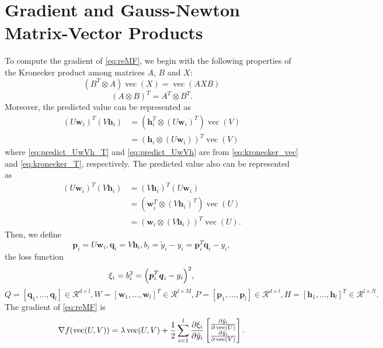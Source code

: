 \documentclass[11pt,twoside]{article}
\newcommand{\bsym}[1]{\ensuremath{\boldsymbol{#1}}}
\newcommand{\bw}{\ensuremath{\bsym{w}}}
\newcommand{\bp}{\ensuremath{\bsym{p}}}
\newcommand{\bq}{\ensuremath{\bsym{q}}}
\newcommand{\bh}{\ensuremath{\bsym{h}}}
\newcommand{\bbr}{\ensuremath{\mathcal R}}
\DeclareMathOperator*{\vectorize}{vec}
\begin{document}
\section{Gradient and Gauss-Newton Matrix-Vector Products}
To compute the gradient of \eqref{eq:reMF}, we begin with the following properties of  the Kronecker product among matrices $A$, $B$ and $X$:
\begin{equation}
(B^T \otimes A)\vectorize(X) = \vectorize(AXB)
\label{eq:kronecker_vec}
\end{equation}
\begin{equation}
(A \otimes B)^T = A^T \otimes B^T
\label{eq:kronecker_T}.
\end{equation}
Moreover, the predicted value can be represented as
\begin{align}
(U \bw_i)^T (V \bh_i) &= (\bh_i^T \otimes (U \bw_i)^T)\vectorize(V)\label{eq:predict_UwVh_T} \\
&= (\bh_i \otimes (U \bw_i))^T\vectorize(V)
\label{eq:predict_UwVh}
\end{align}
where \eqref{eq:predict_UwVh_T} and \eqref{eq:predict_UwVh} are from \eqref{eq:kronecker_vec} and \eqref{eq:kronecker_T}, respectively.
The predicted value also can be represented as
\begin{align}
(U \bw_i)^T (V \bh_i) &= (V \bh_i)^T (U \bw_i) \nonumber \\
&= (\bw_i^T \otimes (V \bh_i)^T)\vectorize(U)\nonumber \\
&= (\bw_i \otimes (V \bh_i))^T \vectorize(U)
\label{eq:predict_VhUw}.
\end{align}
Then, we define 
\begin{equation*}
\bp_i = U\bw_i ,
\bq_i = V\bh_i ,
b_i = \tilde{y}_i-y_i = \bp_i^T\bq_i-y_i ,
\end{equation*}
the loss function 
\begin{equation*}
\xi_i = b_i^2 = \Bigl(\bp_i^T\bq_i-y_i\Bigr)^2, 
\end{equation*}
\begin{equation*}
Q=[\bq_1,\dots,\bq_l] \in \bbr^{d\times l},
W=[\bw_1,\dots,\bw_l]^T \in \bbr^{l\times M},
P=[\bp_1,\dots,\bp_l] \in \bbr^{d\times l},
H=[\bh_1,\dots,\bh_l]^T \in \bbr^{l\times N}.
\end{equation*}
The gradient of \eqref{eq:reMF} is
\begin{align}
\nabla {f}(\vectorize(U, V)) = \lambda \vectorize(U,V) + \frac{1}{2}\sum_{i=1}^{l}\pdv{\xi_i}{\tilde{y}_i}\begin{bmatrix} \frac{\partial \tilde{y}_i}{\partial \vectorize(U)} \\ \frac{\partial \tilde{y}_i}{\partial \vectorize(V)} \end{bmatrix}
\label{eq:gradUV}.
\end{align}
\end{document}
